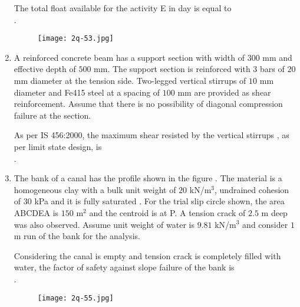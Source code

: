 \documentclass[journal,12pt,onecolumn]{article}
\theoremstyle{remark}
\begin{document}
\begin{enumerate}
    The total float available for the activity E in day is equal to \underline{\hspace{2cm}} \\ .
    \begin{figure}[H]
        \centering
        \texttt{[image: 2q-53.jpg]}
        \caption{}
        \label{fig:q53}
    \end{figure}
    
    \hfill{}

    \item A reinforced concrete beam has a support section with width of $300$ mm and effective depth of $500$ mm. The support section is reinforced with $3$ bars of $20$ mm diameter at the tension side. Two-legged vertical stirrups of $10$ mm diameter and Fe415 steel at a spacing of $100$ mm are provided as shear reinforcement. Assume that there is no possibility of diagonal compression failure at the section.
    
    As per IS 456:2000, the maximum shear resisted by the vertical stirrups , as per limit state design, is \underline{\hspace{2cm}} \\ .
    
    \hfill{}

    \item The bank of a canal has the profile shown in the figure . The material is a homogeneous clay with a bulk unit weight of $20$ kN/m$^3$, undrained cohesion of $30$ kPa and it is fully saturated . For the trial slip circle shown, the area ABCDEA is $150$ m$^2$ and the centroid is at P. A tension crack  of $2.5$ m deep was also observed. Assume unit weight of water is $9.81$ kN/m$^3$ and consider $1$ m run of the bank for the analysis.
    
    Considering the canal is empty and tension crack is completely filled with water, the factor of safety against slope failure of the bank is \underline{\hspace{2cm}} \\ .
    \begin{figure}[H]
        \centering
        \texttt{[image: 2q-55.jpg]}
        \caption{}
        \label{fig:q55}
    \end{figure}
    

\end{enumerate}
\end{document}
